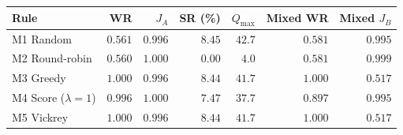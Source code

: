 \begin{tabular}{lrrrrrr}
\toprule
Rule & WR & $J_A$ & SR (\%) & $Q_{\max}$ & Mixed WR & Mixed $J_B$ \\
\midrule
M1 Random & \(0.561\) & \(0.996\) & \(8.45\) & \(42.7\) & \(0.581\) & \(0.995\) \\
M2 Round-robin & \(0.560\) & \(1.000\) & \(0.00\) & \(4.0\) & \(0.581\) & \(0.999\) \\
M3 Greedy & \(1.000\) & \(0.996\) & \(8.44\) & \(41.7\) & \(1.000\) & \(0.517\) \\
M4 Score ($\lambda=1$) & \(0.996\) & \(1.000\) & \(7.47\) & \(37.7\) & \(0.897\) & \(0.995\) \\
M5 Vickrey & \(1.000\) & \(0.996\) & \(8.44\) & \(41.7\) & \(1.000\) & \(0.517\) \\
\bottomrule
\end{tabular}
